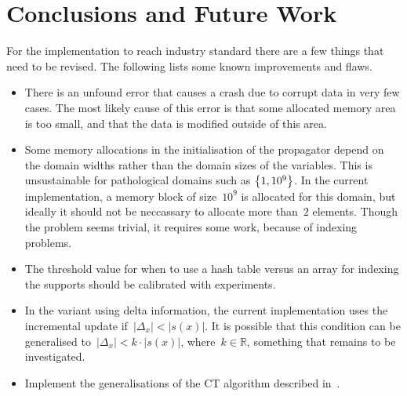 \documentclass[a4paper,11pt]{article}
\numberwithin{equation}{section}
\begin{document}



\section{Conclusions and Future Work}
\label{conclusions}

For the implementation to reach industry standard there
are a few things that need to be revised. The following lists some known
improvements and flaws.

\begin{itemize}
  \item There is an unfound error that causes a crash due to corrupt data 
    in very few cases.
    The most likely cause of this error is that some allocated memory area
    is too small, and that the data is modified outside of this area.
    
  \item Some memory allocations in the initialisation of the propagator
    depend on the domain widths rather
    than the domain sizes of the variables. This is unsustainable
    for pathological domains such as $\left\{1, 10^9\right\}$. In the current
    implementation, a memory block of size~$10^9$ is allocated for this
    domain, but ideally it should not be neccassary to allocate more than~$2$
    elements. Though the problem seems trivial, it requires some
    work, because of indexing problems.

  \item The threshold value for when to use a hash table versus
    an array for indexing the supports should be calibrated with
    experiments.

  \item In the variant using delta information, the current implementation
    uses the incremental update if~$|\Delta_x| < |s(x)|$. It is possible
    that this condition can be generalised to~$|\Delta_x| < k \cdot |s(x)|$,
    where~$k \in \mathbb{R}$, something that remains to be investigated.
    
  \item Implement the generalisations of the CT algorithm described
    in~\cite{DBLP:conf/aaai/VerhaegheLS17}.

\end{itemize}



\end{document}
